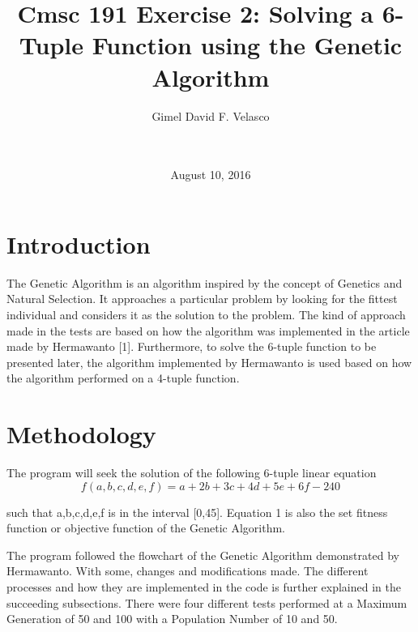\documentclass{acm_proc_article-sp}
\begin{document}
\title{Cmsc 191 Exercise 2: Solving a 6-Tuple Function using the Genetic Algorithm}

\author{
\alignauthor
    Gimel David F. Velasco\\
    \\
    \\
}

\date{August 10, 2016}

\maketitle


\section{Introduction}
The Genetic Algorithm is an algorithm inspired by the concept of Genetics and Natural Selection. It approaches a particular problem by looking for the fittest individual and considers it as the solution to the problem. The kind of approach made in the tests are based on how the algorithm was implemented in the article made by Hermawanto [1]. Furthermore, to solve the 6-tuple function to be presented later, the algorithm implemented by Hermawanto is used based on how the algorithm performed on a 4-tuple function.

\section{Methodology}
The program will seek the solution of the following 6-tuple linear equation
\begin{equation}
f(a,b,c,d,e,f) = a + 2b + 3c + 4d + 5e + 6f -240
\end{equation}

such that a,b,c,d,e,f is in the interval [0,45]. Equation 1 is also the set fitness function or objective function of the Genetic Algorithm.

The program followed the flowchart of the Genetic Algorithm demonstrated by Hermawanto. With some, changes and modifications made. The different processes and how they are implemented in the code is further explained in the succeeding subsections. There were four different tests performed at a Maximum Generation of 50 and 100 with a Population Number of 10 and 50.
\end{document}
